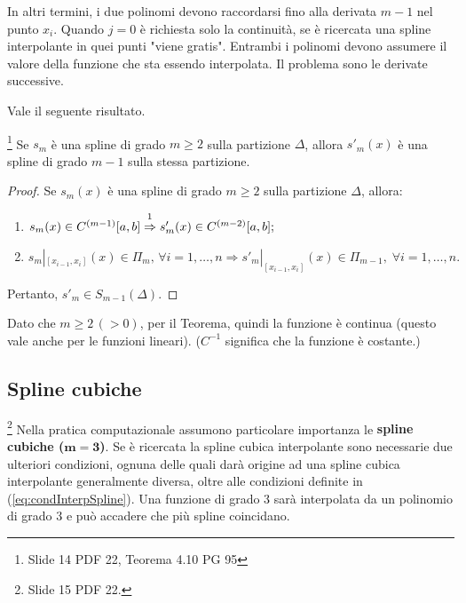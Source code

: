 \noindent\footnotemark In altri termini, i due polinomi devono raccordarsi fino alla derivata $m-1$ nel punto $x_i$. Quando $j=0$ è richiesta solo la continuità, se è ricercata una spline interpolante in quei punti "viene gratis". Entrambi i polinomi devono assumere il valore della funzione che sta essendo interpolata. Il problema sono le derivate successive.

Vale il seguente risultato.

\begin{theorem}\label{th:gradoDervSpline}
    \footnote{Slide 14 PDF 22, Teorema 4.10 PG 95} Se $s_m$ è una spline di grado $m\geq 2$ sulla partizione $\Delta$, allora $s'_m(x)$ è una spline di grado $m-1$ sulla stessa partizione.
\end{theorem}
\begin{proof}
    Se $s_m(x)$ è una spline di grado $m\geq 2$ sulla partizione $\Delta$, allora:
    \begin{enumerate}
        \item $s_m(x)\in C^{(m-1)}[a,b]\overset{\footnotemark}{\Rightarrow} s'_m(x)\in C^{(m-2)}[a,b];$
        \item $s_m|_{[x_{i-1},x_i]}(x)\in\Pi_m,\,\forall i=1,\hdots,n\Rightarrow s'_m|_{[x_{i-1},x_i]}(x)\in\Pi_{m-1},\;\forall i=1,\hdots,n.$
    \end{enumerate}
    Pertanto, $s'_m\in S_{m-1}(\Delta).$
\end{proof}
Dato che $m\geq 2\,(>0)$, per il Teorema, quindi la funzione è continua (questo vale anche per le funzioni lineari). ($C^{-1}$ significa che la funzione è costante.)

\subsection{Spline cubiche}
\begin{remark}
    \footnote{Slide 15 PDF 22.}
    Nella pratica computazionale assumono particolare importanza le \textbf{spline cubiche ($\boldsymbol{m=3}$)}. Se è ricercata la spline cubica interpolante sono necessarie due ulteriori condizioni, ognuna delle quali darà origine ad una spline cubica interpolante generalmente diversa, oltre alle condizioni definite in (\ref{eq:condInterpSpline}). Una funzione di grado 3 sarà interpolata da un polinomio di grado 3 e può accadere che più spline coincidano.
\end{remark}

